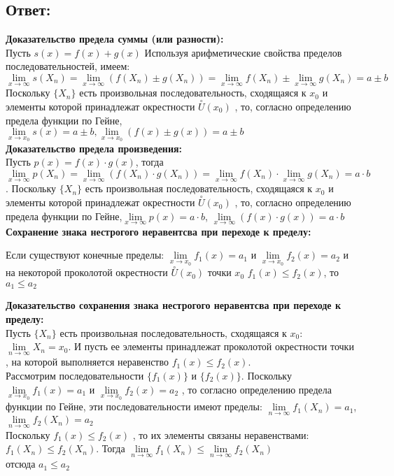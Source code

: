 \documentclass{article}
\begin{document}
\subsection*{Ответ:}
\textbf{Доказательство предела суммы (или разности):}\\
Пусть $s(x)=f(x)+g(x)$
Используя арифметические свойства пределов последовательностей, имеем:
$\lim\limits_{x\to \infty} s(X_n) = \lim\limits_{x\to \infty} (f(X_n)\pm g(X_n))  = \lim\limits_{x\to \infty} f(X_n) \pm \lim\limits_{x\to \infty} g(X_n) = a \pm b$
Поскольку $\{X_n\}$ есть произвольная последовательность, сходящаяся к $x_0$ и элементы которой принадлежат окрестности $\stackrel{\circ}{U}(x_0)$ , то, согласно определению предела функции по Гейне,$\lim\limits_{x\to x_0} s(x) = a \pm b, \lim\limits_{x\to x_0} (f(x)\pm g(x)) = a \pm b$
\\
\textbf{Доказательство предела произведения:}\\
Пусть $p(x)=f(x)\cdot g(x)$, тогда $\lim\limits_{x\to \infty} p(X_n) = \lim\limits_{x\to \infty} (f(X_n) \cdot g(X_n)) = \lim\limits_{x\to \infty} f(X_n) \cdot \lim\limits_{x\to \infty} g(X_n) = a \cdot b$.
Поскольку $\{X_n\}$ есть произвольная последовательность, сходящаяся к $x_0$ и элементы которой принадлежат окрестности $\stackrel{\circ}{U}(x_0)$ , то, согласно определению предела функции по Гейне,$\lim\limits_{x\to \infty} p(x) = a \cdot b$,
$\lim\limits_{x\to \infty} (f(x) \cdot g(x)) = a \cdot b$\\
\textbf{Сохранение знака нестрогого неравентсва при переходе к пределу:}
\begin{center}
  Если существуют конечные пределы: $\lim\limits_{x \to x_0} f_1(x) = a_1$ и $\lim\limits_{x \to x_0} f_2(x) = a_2$ и на некоторой проколотой окрестности $\stackrel{\circ}{U}(x_0)$ точки $x_0$ $f_1(x) \leq f_2(x)$, то $a_1 \leq a_2$
\end{center}
\textbf{Доказательство сохранения знака нестрогого неравентсва при переходе к пределу:}\\
Пусть $\{X_n\}$ есть произвольная последовательность, сходящаяся к $x_0$: $\lim\limits_{n \to \infty} X_n = x_0$. И пусть ее элементы принадлежат проколотой окрестности точки , на которой выполняется неравенство $f_1(x) \leq f_2(x)$.\\
Рассмотрим последовательности $\{f_1(x)\}$ и $\{f_2(x)\}$.
Поскольку $\lim\limits_{x \to x_0} f_1(x) = a_1$
и $\lim\limits_{x \to x_0} f_2(x) = a_2$
, то согласно определению предела функции по Гейне, эти последовательности имеют пределы:  $\lim\limits_{n \to \infty} f_1(X_n) = a_1$, $\lim\limits_{n \to \infty} f_2(X_n) = a_2$\\
Поскольку $f_1(x) \leq f_2(x)$ , то их элементы связаны неравенствами:
$f_1(X_n) \leq f_2(X_n)$. Тогда $\lim\limits_{n \to \infty} f_1(X_n) \leq \lim\limits_{n \to \infty} f_2(X_n)$\\ отсюда $a_1 \leq a_2$
\end{document}
